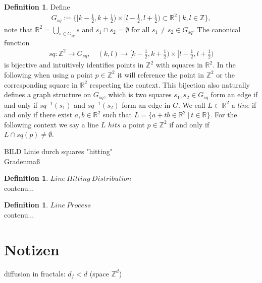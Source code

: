 \documentclass[12pt,a4paper]{scrartcl}
\numberwithin{equation}{section}
\numberwithin{equation}{section}%
\theoremstyle{definition}
\newtheorem{definition}[theorem]{Definition}
\theoremstyle{definition}
\begin{document}
\begin{definition}
	Define 
	\begin{align}
		G_{sq} := \{[k - \frac{1}{2}, k + \frac{1}{2}) \times [l- \frac{1}{2}, l + \frac{1}{2}) \subset \mathbb{R}^2\ |\ k,l \in \mathbb{Z}\}, 
	\end{align} 
	note that $\mathbb{R}^2 = \bigcup_{s\in G_{sq}} s$ and $s_1\cap s_2 = \emptyset$ for all $s_1\neq s_2\in G_{sq}$. The canonical function
	\begin{align}
	sq: \mathbb{Z}^2 \to G_{sq},\quad (k,l)\to [k - \frac{1}{2}, k + \frac{1}{2}) \times [l- \frac{1}{2}, l + \frac{1}{2})
	\end{align}
	is bijective and intuitively identifies points in $\mathbb{Z}^2$ with squares in $\mathbb{R}^2$. In the following when using a point $p\in \mathbb{Z}^2$ it will reference the point in $\mathbb{Z}^2$ or the corresponding square in $\mathbb{R}^2$ respecting the context. This bijection also naturally defines a graph structure on $G_{sq}$, which is two squares $s_1, s_2\in G_{sq}$ form an edge if and only if $sq^{-1}(s_1)$ and $sq^{-1}(s_2)$ form an edge in $G$. We call $L\subset \mathbb{R}^2$ a $line$ if and only if there exist $a,b\in \mathbb{R}^2$ such that $L=\{a+tb\in \mathbb{R}^2\ |\ t\in \mathbb{R}\}$. For the following context we say a line $L$ $hits$ a point $p\in \mathbb{Z}^2$ if and only if $L\cap sq(p) \neq \emptyset$.
	
\end{definition}

BILD Linie durch squares "hitting"\\
Gradenmaß

\begin{definition} $\mathit{Line\ Hitting\ Distribution}$\\
	contenu...
\end{definition}

\begin{definition} $\mathit{Line\ Process}$\\
	contenu...
\end{definition}



\newpage


\section{Notizen}

diffusion in fractals: $d_f < d$ (space $\mathbb{Z}^d$)


\newpage
\end{document}
